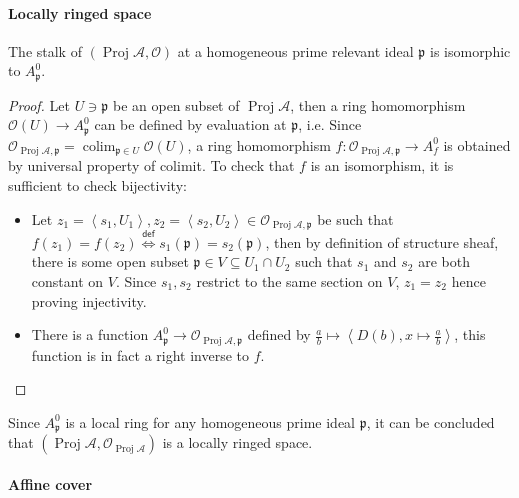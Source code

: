 \documentclass[a4paper,UKenglish,cleveref, autoref, thm-restate]{lipics-v2021}
\begin{document}
\paragraph*{Locally ringed space}
\begin{theorem}\label{thm:proj_as_locally_ringed_space}
    The stalk of $(\operatorname{Proj}\mathcal{A}, \mathcal{O})$ at a homogeneous prime relevant ideal $\mathfrak{p}$ is isomorphic to $A^0_\mathfrak{p}$.
\end{theorem}
\begin{proof}
    Let $U\ni\mathfrak{p}$ be an open subset of $\operatorname{Proj}\mathcal{A}$, then a ring homomorphism $\mathcal{O}(U)\to A^0_\mathfrak{p}$ can be defined by evaluation at $\mathfrak p$, i.e. Since $\mathcal{O}_{\operatorname{Proj}\mathcal{A},\mathfrak{p}}=\operatorname{colim}_{\mathfrak{p}\in U}\mathcal{O}(U)$, a ring homomorphism $f:\mathcal{O}_{\operatorname{Proj}\mathcal{A},\mathfrak{p}}\to A^0_f$ is obtained by universal property of colimit. To check that $f$ is an isomorphism, it is sufficient to check bijectivity:
    \begin{itemize}
        \item Let $z_1=\left\langle s_1, U_1\right\rangle, z_2=\left\langle s_2, U_2\right\rangle \in \mathcal{O}_{\operatorname{Proj}\mathcal{A},\mathfrak{p}}$ be such that $f(z_1)=f(z_2) \stackrel{\mathsf{def}}{\iff} s_1(\mathfrak{p})=s_2(\mathfrak{p})$, then by definition of structure sheaf, there is some open subset $\mathfrak{p}\in V\subseteq U_1\cap U_2$ such that $s_1$ and $s_2$ are both constant on $V$. Since $s_1, s_2$ restrict to the same section on $V$, $z_1 = z_2$ hence proving injectivity.
        \item There is a function $A^0_{\mathfrak{p}}\to \mathcal{O}_{\operatorname{Proj}\mathcal{A},\mathfrak{p}}$ defined by $\frac a b\mapsto \left\langle D(b), x\mapsto \frac a b\right\rangle$, this function is in fact a right inverse to $f$.
    \end{itemize}
\end{proof}

Since $A^0_{\mathfrak{p}}$ is a local ring for any homogeneous prime ideal $\mathfrak{p}$, it can be concluded that $(\operatorname{Proj}\mathcal{A},\mathcal{O}_{\operatorname{Proj}\mathcal{A}})$ is a locally ringed space.

\paragraph*{Affine cover}
\end{document}
